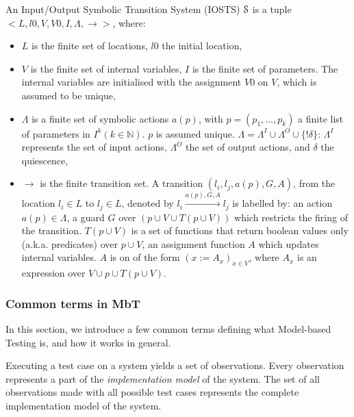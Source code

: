 \begin{definition}
An Input/Output Symbolic Transition System (IOSTS) $\EuScript{S}$
is a tuple $< L,l0,V,V0,I,\Lambda,\rightarrow>$, where:

\begin{itemize}
\item $L$ is the finite set of locations, $l0$ the initial
location,

\item $V$ is the finite set of internal variables, $I$ is the
finite set of parameters. The internal variables are initialised
with the assignment $V0$ on $V$, which is assumed to be unique,

\item $\Lambda$ is a finite set of symbolic actions $a(p)$, with
$p = (p_1,\dots,p_k)$ a finite list of parameters in $I^k(k \in
\mathbb{N})$. $p$ is assumed unique. $\Lambda= \Lambda^I  \cup
\Lambda^O \cup \{!\delta \}$: $\Lambda^I$ represents the set of
input actions, $\Lambda^O$ the set of output actions, and
$\delta$ the quiescence,

\item $\rightarrow$ is the finite transition set. A transition
$(l_i,l_j,a(p),G,A)$, from the location $l_i \in L$ to $l_j \in
L$, denoted by $l_i \xrightarrow{a(p),G,A} l_j$ is labelled by: an
action $a(p) \in \Lambda$, a guard  $G$ over $(p \cup V \cup T(p
\cup V))$ which restricts the firing of the transition. $T(p \cup
V)$ is a set of functions that return boolean values only (a.k.a.
predicates) over $p \cup V$, an assignment function $A$ which
updates internal variables. $A$ is on of the form $(x:=A_x)_{x\in
V}$, where $A_x$ is an expression over $V \cup p \cup T(p \cup
V)$.
\end{itemize}
\end{definition}

\subsubsection{Common terms in MbT}

In this section, we introduce a few common terms defining what
Model-based Testing is, and how it works in general.

Executing a test case on a system yields a set of observations.
Every observation represents a part of the \textit{implementation
model} of the system. The set of all observations made with all
possible test cases represents the complete implementation model
of the system.

